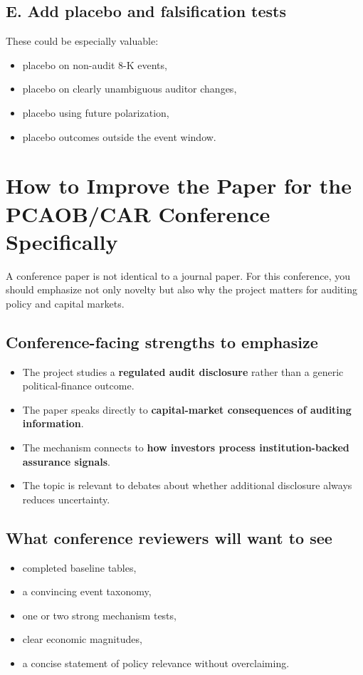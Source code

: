 \documentclass[12pt]{article}
\begin{document}
\subsection{E. Add placebo and falsification tests}
These could be especially valuable:
\begin{itemize}[leftmargin=2em]
    \item placebo on non-audit 8-K events,
    \item placebo on clearly unambiguous auditor changes,
    \item placebo using future polarization,
    \item placebo outcomes outside the event window.
\end{itemize}

\section{How to Improve the Paper for the PCAOB/CAR Conference Specifically}
A conference paper is not identical to a journal paper. For this conference, you should emphasize not only novelty but also why the project matters for auditing policy and capital markets.

\subsection*{Conference-facing strengths to emphasize}
\begin{itemize}[leftmargin=2em]
    \item The project studies a \textbf{regulated audit disclosure} rather than a generic political-finance outcome.
    \item The paper speaks directly to \textbf{capital-market consequences of auditing information}.
    \item The mechanism connects to \textbf{how investors process institution-backed assurance signals}.
    \item The topic is relevant to debates about whether additional disclosure always reduces uncertainty.
\end{itemize}

\subsection*{What conference reviewers will want to see}
\begin{itemize}[leftmargin=2em]
    \item completed baseline tables,
    \item a convincing event taxonomy,
    \item one or two strong mechanism tests,
    \item clear economic magnitudes,
    \item a concise statement of policy relevance without overclaiming.
\end{itemize}
\end{document}
